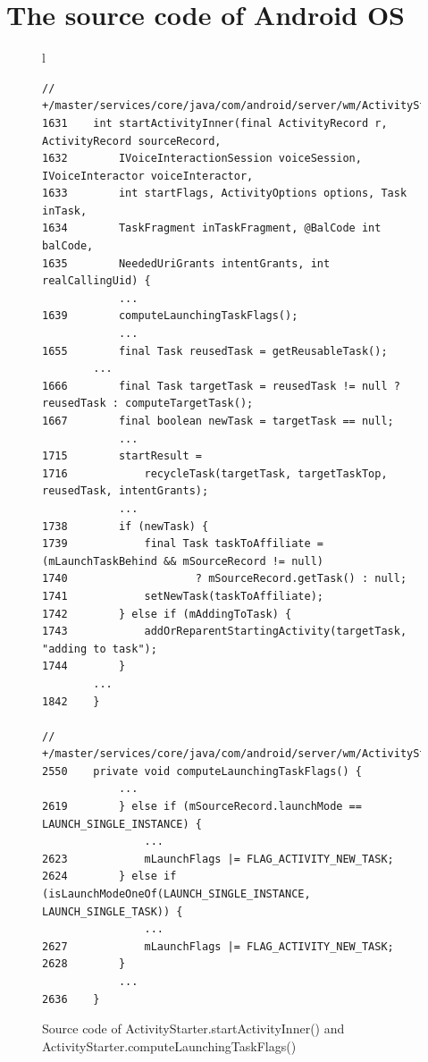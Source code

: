 \newpage
\section{The source code of Android OS}\label{sec:souce-code}
\begin{figure}[H]
\centering
\begin{tabular*}{\linewidth}{l}
\begin{lstlisting}
// +/master/services/core/java/com/android/server/wm/ActivityStarter.java
1631    int startActivityInner(final ActivityRecord r, ActivityRecord sourceRecord,
1632        IVoiceInteractionSession voiceSession, IVoiceInteractor voiceInteractor,
1633        int startFlags, ActivityOptions options, Task inTask,
1634        TaskFragment inTaskFragment, @BalCode int balCode,
1635        NeededUriGrants intentGrants, int realCallingUid) {
            ...
1639        computeLaunchingTaskFlags();
            ...
1655	    final Task reusedTask = getReusableTask();
	    ...
1666        final Task targetTask = reusedTask != null ? reusedTask : computeTargetTask();
1667	    final boolean newTask = targetTask == null;
            ...
1715        startResult = 
1716            recycleTask(targetTask, targetTaskTop, reusedTask, intentGrants);
            ...
1738	    if (newTask) {
1739            final Task taskToAffiliate = (mLaunchTaskBehind && mSourceRecord != null)
1740                    ? mSourceRecord.getTask() : null;
1741            setNewTask(taskToAffiliate);
1742        } else if (mAddingToTask) {
1743            addOrReparentStartingActivity(targetTask, "adding to task");
1744        }
	    ...
1842    }

// +/master/services/core/java/com/android/server/wm/ActivityStarter.java
2550    private void computeLaunchingTaskFlags() {
            ...
2619        } else if (mSourceRecord.launchMode == LAUNCH_SINGLE_INSTANCE) {
                ...
2623            mLaunchFlags |= FLAG_ACTIVITY_NEW_TASK;
2624        } else if (isLaunchModeOneOf(LAUNCH_SINGLE_INSTANCE, LAUNCH_SINGLE_TASK)) {
                ...
2627            mLaunchFlags |= FLAG_ACTIVITY_NEW_TASK;
2628        }
            ...
2636    }
\end{lstlisting}
\end{tabular*}
\caption{Source code of ActivityStarter.startActivityInner() and ActivityStarter.computeLaunchingTaskFlags()}
\label{code-startActivityInner}
\end{figure}

